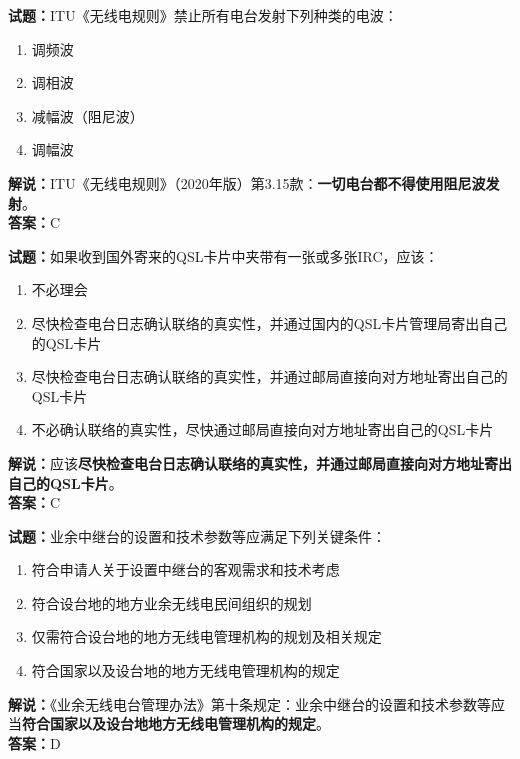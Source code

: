 \documentclass{ctexbook}
\begin{document}
\bigskip




\noindent\textbf{试题：}ITU《无线电规则》禁止所有电台发射下列种类的电波：
\begin{enumerate}[leftmargin=3em]
\item 调频波
\item 调相波
\item 减幅波（阻尼波）
\item 调幅波
\end{enumerate}
\noindent\textbf{解说：}ITU《无线电规则》（2020年版）第3.15款：\textbf{一切电台都不得使用阻尼波发射}。\\\noindent\textbf{答案：}C

\bigskip




\noindent\textbf{试题：}如果收到国外寄来的QSL卡片中夹带有一张或多张IRC，应该：
\begin{enumerate}[leftmargin=3em]
\item 不必理会
\item 尽快检查电台日志确认联络的真实性，并通过国内的QSL卡片管理局寄出自己的QSL卡片
\item 尽快检查电台日志确认联络的真实性，并通过邮局直接向对方地址寄出自己的QSL卡片
\item 不必确认联络的真实性，尽快通过邮局直接向对方地址寄出自己的QSL卡片
\end{enumerate}
\noindent\textbf{解说：}应该\textbf{尽快检查电台日志确认联络的真实性，并通过邮局直接向对方地址寄出自己的QSL卡片}。\\\noindent\textbf{答案：}C

\bigskip




\noindent\textbf{试题：}业余中继台的设置和技术参数等应满足下列关键条件：
\begin{enumerate}[leftmargin=3em]
\item 符合申请人关于设置中继台的客观需求和技术考虑
\item 符合设台地的地方业余无线电民间组织的规划
\item 仅需符合设台地的地方无线电管理机构的规划及相关规定
\item 符合国家以及设台地的地方无线电管理机构的规定
\end{enumerate}
\noindent\textbf{解说：}《业余无线电台管理办法》第十条规定：业余中继台的设置和技术参数等应当\textbf{符合国家以及设台地地方无线电管理机构的规定}。\\\noindent\textbf{答案：}D

\bigskip
\end{document}
